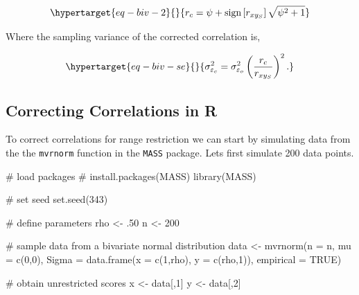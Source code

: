\documentclass[
  letterpaper,
  DIV=11,
  numbers=noendperiod]{scrreprt}
\newenvironment{Shaded}{\begin{snugshade}}{\end{snugshade}}
\newcommand{\AttributeTok}[1]{\textcolor[rgb]{0.40,0.45,0.13}{#1}}
\newcommand{\CommentTok}[1]{\textcolor[rgb]{0.37,0.37,0.37}{#1}}
\newcommand{\ConstantTok}[1]{\textcolor[rgb]{0.56,0.35,0.01}{#1}}
\newcommand{\DecValTok}[1]{\textcolor[rgb]{0.68,0.00,0.00}{#1}}
\newcommand{\FunctionTok}[1]{\textcolor[rgb]{0.28,0.35,0.67}{#1}}
\newcommand{\NormalTok}[1]{\textcolor[rgb]{0.00,0.23,0.31}{#1}}
\newcommand{\OtherTok}[1]{\textcolor[rgb]{0.00,0.23,0.31}{#1}}
\begin{document}
\begin{equation}\protect\hypertarget{eq-biv-2}{}{
r_c = \psi + \text{sign}\left[r_{xy_S}\right]\sqrt{\psi^2+1}
}\label{eq-biv-2}\end{equation}

Where the sampling variance of the corrected correlation is,

\begin{equation}\protect\hypertarget{eq-biv-se}{}{
\sigma^2_{\varepsilon_c} = \sigma^2_{\varepsilon_o}\left(\frac{r_c}{r_{xy_S}}\right)^2.
}\label{eq-biv-se}\end{equation}

\hypertarget{correcting-correlations-in-r-3}{%
\subsection{Correcting Correlations in
R}\label{correcting-correlations-in-r-3}}

To correct correlations for range restriction we can start by simulating
data from the the \texttt{mvrnorm} function in the \texttt{MASS}
package. Lets first simulate 200 data points.

\begin{Shaded}
\begin{Highlighting}[]
\CommentTok{\# load packages}
\CommentTok{\# install.packages(\textquotesingle{}MASS\textquotesingle{})}
\FunctionTok{library}\NormalTok{(MASS)}

\CommentTok{\# set seed}
\FunctionTok{set.seed}\NormalTok{(}\DecValTok{343}\NormalTok{)}

\CommentTok{\# define parameters }
\NormalTok{rho }\OtherTok{\textless{}{-}}\NormalTok{ .}\DecValTok{50}
\NormalTok{n }\OtherTok{\textless{}{-}} \DecValTok{200}

\CommentTok{\# sample data from a bivariate normal distribution}
\NormalTok{data }\OtherTok{\textless{}{-}} \FunctionTok{mvrnorm}\NormalTok{(}\AttributeTok{n =}\NormalTok{ n,}
                \AttributeTok{mu =} \FunctionTok{c}\NormalTok{(}\DecValTok{0}\NormalTok{,}\DecValTok{0}\NormalTok{),}
                \AttributeTok{Sigma =} \FunctionTok{data.frame}\NormalTok{(}\AttributeTok{x =} \FunctionTok{c}\NormalTok{(}\DecValTok{1}\NormalTok{,rho),}
                                  \AttributeTok{y =} \FunctionTok{c}\NormalTok{(rho,}\DecValTok{1}\NormalTok{)),}
                \AttributeTok{empirical =} \ConstantTok{TRUE}\NormalTok{)}

\CommentTok{\# obtain unrestricted scores}
\NormalTok{x }\OtherTok{\textless{}{-}}\NormalTok{ data[,}\DecValTok{1}\NormalTok{]}
\NormalTok{y }\OtherTok{\textless{}{-}}\NormalTok{ data[,}\DecValTok{2}\NormalTok{]}
\end{Highlighting}
\end{Shaded}
\end{document}
